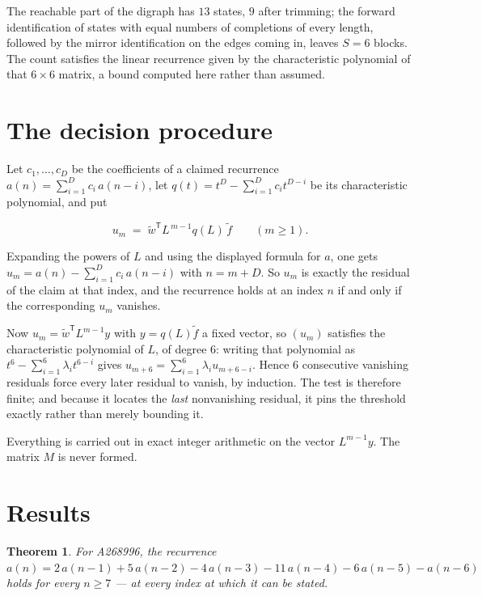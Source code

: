 \documentclass[11pt]{article}
\newtheorem{theorem}{Theorem}
\theoremstyle{definition}
\begin{document}
The reachable part of the digraph has $13$ states, $9$ after trimming; the forward identification of states with equal numbers of completions of every length, followed by the mirror identification on the edges coming in, leaves $S = 6$ blocks. The count satisfies the linear recurrence given by the characteristic polynomial of that $6\times6$ matrix, a bound computed here rather than assumed.

\section{The decision procedure}

Let $c_1,\dots,c_D$ be the coefficients of a claimed recurrence $a(n) = \sum_{i=1}^{D} c_i\,a(n-i)$, let $q(t) = t^{D} - \sum_{i=1}^{D} c_i t^{D-i}$ be its characteristic polynomial, and put

\[u_m \;=\; \tilde w^{\mathsf T} L^{\,m-1} q(L)\,\tilde f \qquad (m \ge 1).\]

Expanding the powers of $L$ and using the displayed formula for $a$, one gets $u_m = a(n) - \sum_{i=1}^{D} c_i\,a(n-i)$ with $n = m + D$. So $u_m$ is exactly the residual of the claim at that index, and the recurrence holds at an index $n$ if and only if the corresponding $u_m$ vanishes.

Now $u_m = \tilde w^{\mathsf T} L^{m-1} y$ with $y = q(L)\tilde f$ a fixed vector, so $(u_m)$ satisfies the characteristic polynomial of $L$, of degree $6$: writing that polynomial as $t^{6} - \sum_{i=1}^{6} \lambda_i t^{6-i}$ gives $u_{m+6} = \sum_{i=1}^{6} \lambda_i u_{m+6-i}$. Hence $6$ consecutive vanishing residuals force every later residual to vanish, by induction. The test is therefore finite; and because it locates the {\itshape last} nonvanishing residual, it pins the threshold exactly rather than merely bounding it.

Everything is carried out in exact integer arithmetic on the vector $L^{m-1}y$. The matrix $M$ is never formed.

\section{Results}

\begin{theorem} For A268996, the recurrence $a(n) = 2\,a(n-1) + 5\,a(n-2) - 4\,a(n-3) - 11\,a(n-4) - 6\,a(n-5) - a(n-6)$ holds for every $n \ge 7$ --- at every index at which it can be stated.\end{theorem}
\end{document}
